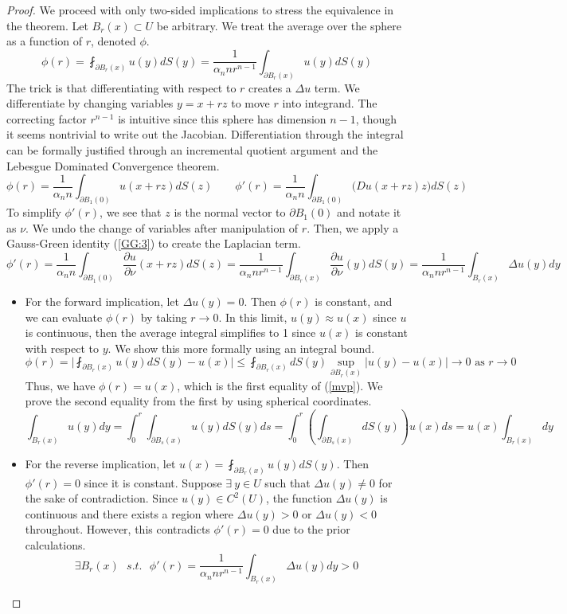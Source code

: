 \documentclass[titlepage]{article}
\renewcommand{\;}{\:\:\:} %
\newcommand{\f}[2]{\frac{#1}{#2}} %
\newcommand{\p}{\partial} %
\theoremstyle{definition}
\theoremstyle{theorem}
\theoremstyle{remark}
\theoremstyle{lemma}
\begin{document}
\begin{proof}
We proceed with only two-sided implications to stress the equivalence in the theorem. Let $B_r(x) \subset U$ be arbitrary. We treat the average over the sphere as a function of $r$, denoted $\phi$.
\begin{equation}
    \phi(r) = \fint_{\p B_r(x)} u(y) dS(y)
    = \f{1}{\alpha_n n r^{n-1}} \int_{\p B_r(x)} u(y) dS(y)
\end{equation}
The trick is that differentiating with respect to $r$ creates a $\Delta u$ term. We differentiate by changing variables $y = x + rz$ to move $r$ into integrand. The correcting factor $r^{n-1}$ is intuitive since this sphere has dimension $n-1$, though it seems nontrivial to write out the Jacobian. Differentiation through the integral can be formally justified through an incremental quotient argument and the Lebesgue Dominated Convergence theorem.
$$ \phi(r) = \f{1}{\alpha_n n} \int_{\p B_1(0)} u(x+rz) dS(z) \qquad
\phi'(r) = \f{1}{\alpha_n n} \int_{\p B_1(0)} \big(Du(x+rz) z\big) dS(z) $$
To simplify $\phi'(r)$, we see that $z$ is the normal vector to $\p B_1(0)$ and notate it as $\nu$. We undo the change of variables after manipulation of $r$. Then, we apply a Gauss-Green identity (\ref{GG:3}) to create the Laplacian term.
$$ \phi'(r) =  \f{1}{\alpha_n n} \int_{\p B_1(0)} \f{\p u}{\p \nu}(x+rz) dS(z)
= \f{1}{\alpha_n n r^{n-1}} \int_{\p B_r(x)} \f{\p u}{\p \nu}(y) dS(y)
= \f{1}{\alpha_n n r^{n-1}} \int_{B_r(x)} \Delta u(y) dy $$
\begin{itemize}
    \item %
For the forward implication, let $\Delta u(y) = 0$. Then $\phi(r)$ is constant, and we can evaluate $\phi(r)$ by taking $r \rightarrow 0$. In this limit, $u(y) \approx u(x)$ since $u$ is continuous, then the average integral simplifies to 1 since $u(x)$ is constant with respect to $y$. We show this more formally using an integral bound.
$$ \phi(r) = \Big|\fint_{\p B_r(x)} u(y) dS(y) - u(x) \Big|
\leq \fint_{\p B_r(x)} dS(y) \sup_{\p B_r(x)} |u(y) - u(x)| \rightarrow 0 \text{ as } r \rightarrow 0 $$
Thus, we have $\phi(r) = u(x)$, which is the first equality of (\ref{mvp}). We prove the second equality from the first by using spherical coordinates.
$$ \int_{B_r(x)} u(y) dy = \int_0^r \int_{\p B_s(x)} u(y) dS(y) ds 
= \int_0^r \left(\int_{\p B_s(x)} dS(y)\right) u(x) ds 
= u(x) \int_{B_r(x)} dy $$
    \item %
For the reverse implication, let $u(x) = \fint_{\p B_r(x)} u(y) dS(y)$. Then $\phi'(r) = 0$ since it is constant. Suppose $\exists\: y \in U$ such that $\Delta u(y) \neq 0$ for the sake of contradiction. Since $u(y) \in C^2(U)$, the function $\Delta u(y)$ is continuous and there exists a region where $\Delta u(y) > 0$ or $\Delta u(y) < 0$ throughout. However, this contradicts $\phi'(r) = 0$ due to the prior calculations.
$$ \exists B_r(x) \; s.t. \; \phi'(r) 
= \f{1}{\alpha_n n r^{n-1}} \int_{B_r(x)} \Delta u(y) dy > 0 $$
\end{itemize}
\end{proof}
\end{document}
